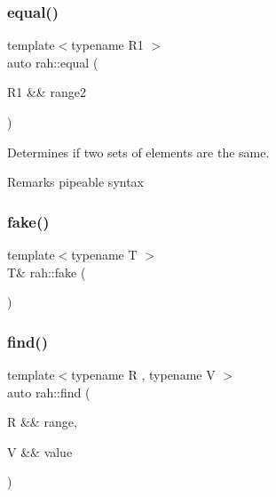 \subsubsection{\texorpdfstring{equal()}{equal()}\hspace{0.1cm}{\footnotesize\ttfamily [2/2]}}
{\footnotesize\ttfamily template$<$typename R1 $>$ \\
auto rah\+::equal (\begin{DoxyParamCaption}\item[{R1 \&\&}]{range2 }\end{DoxyParamCaption})}



Determines if two sets of elements are the same. 

\begin{DoxyRemark}{Remarks}
pipeable syntax
\end{DoxyRemark}

\begin{DoxyCodeInclude}{0}
\end{DoxyCodeInclude}
\mbox{\label{namespacerah_a11785bbdf970efa1bc57fc14993b77bf}} 
\subsubsection{\texorpdfstring{fake()}{fake()}}
{\footnotesize\ttfamily template$<$typename T $>$ \\
T\& rah\+::fake (\begin{DoxyParamCaption}{ }\end{DoxyParamCaption})}

\mbox{\label{namespacerah_a7c7d4f08068e85923f475a069c3daeb7}} 
\subsubsection{\texorpdfstring{find()}{find()}\hspace{0.1cm}{\footnotesize\ttfamily [1/2]}}
{\footnotesize\ttfamily template$<$typename R , typename V $>$ \\
auto rah\+::find (\begin{DoxyParamCaption}\item[{R \&\&}]{range,  }\item[{V \&\&}]{value }\end{DoxyParamCaption})}



